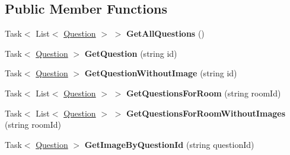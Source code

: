\subsection*{Public Member Functions}
\begin{DoxyCompactItemize}
\item 
\hypertarget{interface_wis_r_rest_a_p_i_1_1_domain_model_1_1_i_question_repository_a65db604342ba23367a3f2d1ccbac77fd}{}Task$<$ List$<$ \hyperlink{class_wis_r_1_1_domain_models_1_1_question}{Question} $>$ $>$ {\bfseries Get\+All\+Questions} ()\label{interface_wis_r_rest_a_p_i_1_1_domain_model_1_1_i_question_repository_a65db604342ba23367a3f2d1ccbac77fd}

\item 
\hypertarget{interface_wis_r_rest_a_p_i_1_1_domain_model_1_1_i_question_repository_ad04ed0d17f879ebaf4d4bd9400daa50d}{}Task$<$ \hyperlink{class_wis_r_1_1_domain_models_1_1_question}{Question} $>$ {\bfseries Get\+Question} (string id)\label{interface_wis_r_rest_a_p_i_1_1_domain_model_1_1_i_question_repository_ad04ed0d17f879ebaf4d4bd9400daa50d}

\item 
\hypertarget{interface_wis_r_rest_a_p_i_1_1_domain_model_1_1_i_question_repository_a3d4ce93af5f351b9ab83b00b2d708276}{}Task$<$ \hyperlink{class_wis_r_1_1_domain_models_1_1_question}{Question} $>$ {\bfseries Get\+Question\+Without\+Image} (string id)\label{interface_wis_r_rest_a_p_i_1_1_domain_model_1_1_i_question_repository_a3d4ce93af5f351b9ab83b00b2d708276}

\item 
\hypertarget{interface_wis_r_rest_a_p_i_1_1_domain_model_1_1_i_question_repository_aedeeacc4e378fc6a3a6b659b75714d4e}{}Task$<$ List$<$ \hyperlink{class_wis_r_1_1_domain_models_1_1_question}{Question} $>$ $>$ {\bfseries Get\+Questions\+For\+Room} (string room\+Id)\label{interface_wis_r_rest_a_p_i_1_1_domain_model_1_1_i_question_repository_aedeeacc4e378fc6a3a6b659b75714d4e}

\item 
\hypertarget{interface_wis_r_rest_a_p_i_1_1_domain_model_1_1_i_question_repository_ad52877c4e29c52a60ff2e027b386f772}{}Task$<$ List$<$ \hyperlink{class_wis_r_1_1_domain_models_1_1_question}{Question} $>$ $>$ {\bfseries Get\+Questions\+For\+Room\+Without\+Images} (string room\+Id)\label{interface_wis_r_rest_a_p_i_1_1_domain_model_1_1_i_question_repository_ad52877c4e29c52a60ff2e027b386f772}

\item 
\hypertarget{interface_wis_r_rest_a_p_i_1_1_domain_model_1_1_i_question_repository_a449c4fa8024ccb27e3ccbba8d690c28e}{}Task$<$ \hyperlink{class_wis_r_1_1_domain_models_1_1_question}{Question} $>$ {\bfseries Get\+Image\+By\+Question\+Id} (string question\+Id)\label{interface_wis_r_rest_a_p_i_1_1_domain_model_1_1_i_question_repository_a449c4fa8024ccb27e3ccbba8d690c28e}


\end{DoxyCompactItemize}
